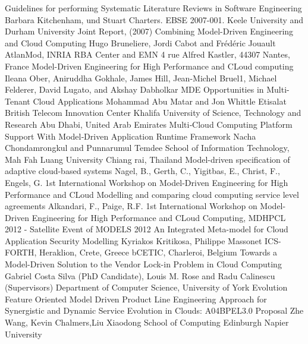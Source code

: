 \documentclass{llncs}
\begin{document}
\begin{thebibliography}{1}
Guidelines for performing Systematic Literature Reviews in Software Engineering
Barbara Kitchenham, und Stuart Charters. EBSE 2007-001. Keele University and Durham University Joint Report, (2007)
Combining Model-Driven Engineering and Cloud Computing
Hugo Bruneliere, Jordi Cabot and Frédéric Jouault AtlanMod, INRIA RBA Center and EMN
4 rue Alfred Kastler, 44307 Nantes, France
\bibitem{}
Model-Driven Engineering for High Performance and CLoud computing
Ileana Ober, Aniruddha Gokhale, James Hill, Jean-Michel Bruel1, Michael Felderer, David Lugato, and Akshay Dabholkar
\bibitem{}
MDE Opportunities in Multi-Tenant Cloud Applications
Mohammad Abu Matar and Jon Whittle
Etisalat British Telecom Innovation Center Khalifa University of Science, Technology and Research Abu Dhabi, United Arab Emirates
\bibitem{}
Multi‐Cloud Computing Platform Support
With Model‐Driven Application Runtime Framework
Nacha Chondamrongkul and Punnarumul Temdee
School of Information Technology, Mah Fah Luang University Chiang rai, Thailand
\bibitem{}
Model-driven specification of adaptive cloud-based systems
Nagel, B., Gerth, C., Yigitbas, E., Christ, F., Engels, G.
 1st International Workshop on Model-Driven Engineering for High Performance and CLoud
\bibitem{}
Modelling and comparing cloud computing service level agreements
Alkandari, F., Paige, R.F.
 1st International Workshop on Model-Driven Engineering for High Performance and CLoud
Computing, MDHPCL 2012 - Satellite Event of MODELS 2012
\bibitem{}
An Integrated Meta-model for Cloud Application Security Modelling
Kyriakos Kritikosa, Philippe Massonet
ICS-FORTH, Heraklion, Crete, Greece bCETIC, Charleroi, Belgium
\bibitem{}
Towards a Model-Driven Solution to the Vendor
Lock-in Problem in Cloud Computing
Gabriel Costa Silva (PhD Candidate), Louis M. Rose and Radu Calinescu (Supervisors)
Department of Computer Science, University of York
\bibitem{}
Evolution Feature Oriented Model Driven
Product Line Engineering Approach for
Synergistic and Dynamic Service
Evolution in Clouds:
A04BPEL3.0 Proposal
Zhe Wang, Kevin Chalmers,Liu Xiaodong
School of Computing
Edinburgh Napier University
\end{thebibliography}
\end{document}
